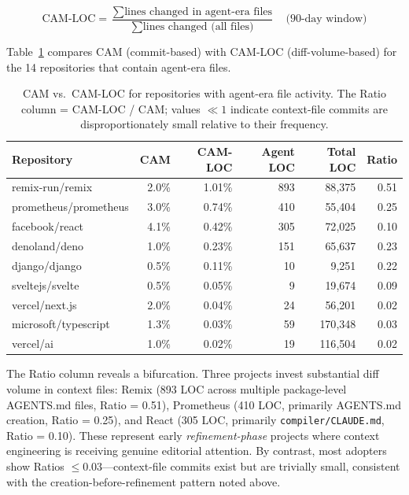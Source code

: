 \documentclass[12pt]{article}
\begin{document}
\begin{equation}
\text{CAM-LOC} = \frac{\sum \text{lines changed in agent-era files}}{\sum \text{lines changed (all files)}} \quad \text{(90-day window)}
\end{equation}

\noindent Table~\ref{tab:cam-loc} compares CAM (commit-based) with CAM-LOC (diff-volume-based) for the 14 repositories that contain agent-era files.

\begin{table}[ht]
\centering
\small
\begin{tabularx}{\textwidth}{lrrrrr}
\toprule
\textbf{Repository} & \textbf{CAM} & \textbf{CAM-LOC} & \textbf{Agent LOC} & \textbf{Total LOC} & \textbf{Ratio} \\
\midrule
remix-run/remix & 2.0\% & 1.01\% & 893 & 88{,}375 & 0.51 \\
prometheus/prometheus & 3.0\% & 0.74\% & 410 & 55{,}404 & 0.25 \\
facebook/react & 4.1\% & 0.42\% & 305 & 72{,}025 & 0.10 \\
denoland/deno & 1.0\% & 0.23\% & 151 & 65{,}637 & 0.23 \\
django/django & 0.5\% & 0.11\% & 10 & 9{,}251 & 0.22 \\
sveltejs/svelte & 0.5\% & 0.05\% & 9 & 19{,}674 & 0.09 \\
vercel/next.js & 2.0\% & 0.04\% & 24 & 56{,}201 & 0.02 \\
microsoft/typescript & 1.3\% & 0.03\% & 59 & 170{,}348 & 0.03 \\
vercel/ai & 1.0\% & 0.02\% & 19 & 116{,}504 & 0.02 \\
\bottomrule
\end{tabularx}
\caption{CAM vs.\ CAM-LOC for repositories with agent-era file activity. The Ratio column = CAM-LOC / CAM; values $\ll 1$ indicate context-file commits are disproportionately small relative to their frequency.}
\label{tab:cam-loc}
\end{table}

The Ratio column reveals a bifurcation. Three projects invest substantial diff volume in context files: Remix (893 LOC across multiple package-level AGENTS.md files, Ratio = 0.51), Prometheus (410 LOC, primarily AGENTS.md creation, Ratio = 0.25), and React (305 LOC, primarily \texttt{compiler/CLAUDE.md}, Ratio = 0.10). These represent early \textit{refinement-phase} projects where context engineering is receiving genuine editorial attention. By contrast, most adopters show Ratios $\leq 0.03$---context-file commits exist but are trivially small, consistent with the creation-before-refinement pattern noted above.
\end{document}
